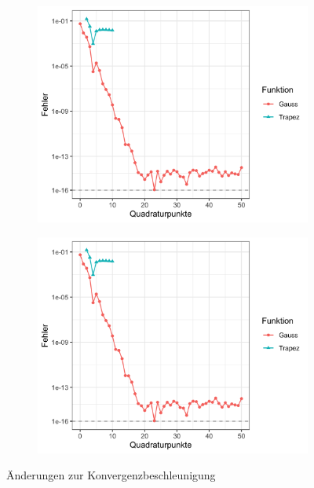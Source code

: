 \documentclass[12pt,a4paper]{scrartcl}
\numberwithin{equation}{section}
\numberwithin{myalgctr}{section}
\numberwithin{mytheoremctr}{section}
\numberwithin{mykorollarctr}{section}
\numberwithin{mylemmactr}{section}
\numberwithin{mybeispielctr}{section}
\begin{document}
	\begin{figure}[H]
		\begin{subfigure}[c]{0.5\textwidth}
			
			\includegraphics[width=\linewidth]{../plots/aufgabe-e2.png}
			\label{fig:gewichtsfunktionen-vergleich}
			
		\end{subfigure}
		\begin{subfigure}[c]{0.5\textwidth}
			\includegraphics[width=\linewidth]{../plots/aufgabe-e2.png}
			\label{fig:gauss-vs-besseretrapez}
		\end{subfigure}
	\caption{\"Anderungen zur Konvergenzbeschleunigung}
	\end{figure}
	
\end{document}
